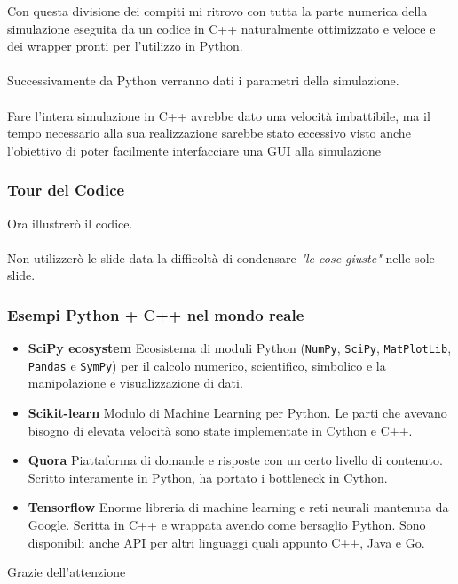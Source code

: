 \documentclass[11pt]{beamer}
\begin{document}
\begin{frame}
Con questa divisione dei compiti mi ritrovo con tutta la parte numerica della simulazione eseguita da un codice in C++ naturalmente ottimizzato e veloce e dei wrapper pronti per l'utilizzo in Python.\\\\
Successivamente da Python verranno dati i parametri della simulazione.\\\\
Fare l'intera simulazione in C++ avrebbe dato una velocità imbattibile, ma il tempo necessario alla sua realizzazione sarebbe stato eccessivo visto anche l'obiettivo di poter facilmente interfacciare una GUI alla simulazione
\end{frame}

\begin{frame}
\frametitle{Tour del Codice}
Ora illustrerò il codice.\\\\
Non utilizzerò le slide data la difficoltà di condensare \textit{"le cose giuste"} nelle sole slide.
\end{frame}

\begin{frame}
\frametitle{Esempi Python + C++ nel mondo reale}
\begin{itemize}
	\pause
	\item \textbf{SciPy ecosystem}
	Ecosistema di moduli Python (\texttt{NumPy}, \texttt{SciPy}, \texttt{MatPlotLib}, \texttt{Pandas} e \texttt{SymPy}) per il calcolo numerico, scientifico, simbolico e la manipolazione e visualizzazione di dati.
	\pause
	\item \textbf{Scikit-learn}
	Modulo di Machine Learning per Python. Le parti che avevano bisogno di elevata velocità sono state implementate in Cython e C++.
	\pause
	\item \textbf{Quora}
	Piattaforma di domande e risposte con un certo livello di contenuto. Scritto interamente in Python, ha portato i bottleneck in Cython.
	\pause
	\item \textbf{Tensorflow}
	Enorme libreria di machine learning e reti neurali mantenuta da Google. Scritta in C++ e wrappata avendo come bersaglio Python. Sono disponibili anche API per altri linguaggi quali appunto C++, Java e Go.
\end{itemize}
\end{frame}

\begin{frame}
\centering
\Huge Grazie dell'attenzione
\end{frame}
\end{document}
